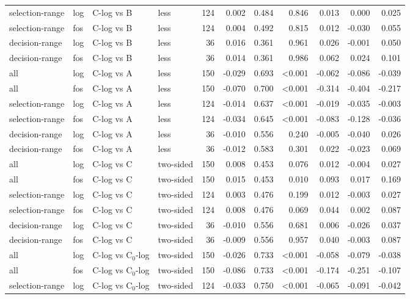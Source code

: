 \begin{longtable}{llllrrrrrrr}
selection-range & log & C-log vs B & less & 124 & 0.002 & 0.484 & 0.846 & 0.013 & 0.000 & 0.025 \\
selection-range & fos & C-log vs B & less & 124 & 0.004 & 0.492 & 0.815 & 0.012 & -0.030 & 0.055 \\
decision-range & log & C-log vs B & less & 36 & 0.016 & 0.361 & 0.961 & 0.026 & -0.001 & 0.050 \\
decision-range & fos & C-log vs B & less & 36 & 0.014 & 0.361 & 0.986 & 0.062 & 0.024 & 0.101 \\
all & log & C-log vs A & less & 150 & -0.029 & 0.693 & <0.001 & -0.062 & -0.086 & -0.039 \\
all & fos & C-log vs A & less & 150 & -0.070 & 0.700 & <0.001 & -0.314 & -0.404 & -0.217 \\
selection-range & log & C-log vs A & less & 124 & -0.014 & 0.637 & <0.001 & -0.019 & -0.035 & -0.003 \\
selection-range & fos & C-log vs A & less & 124 & -0.034 & 0.645 & <0.001 & -0.083 & -0.128 & -0.036 \\
decision-range & log & C-log vs A & less & 36 & -0.010 & 0.556 & 0.240 & -0.005 & -0.040 & 0.026 \\
decision-range & fos & C-log vs A & less & 36 & -0.012 & 0.583 & 0.301 & 0.022 & -0.023 & 0.069 \\
all & log & C-log vs C & two-sided & 150 & 0.008 & 0.453 & 0.076 & 0.012 & -0.004 & 0.027 \\
all & fos & C-log vs C & two-sided & 150 & 0.015 & 0.453 & 0.010 & 0.093 & 0.017 & 0.169 \\
selection-range & log & C-log vs C & two-sided & 124 & 0.003 & 0.476 & 0.199 & 0.012 & -0.003 & 0.027 \\
selection-range & fos & C-log vs C & two-sided & 124 & 0.008 & 0.476 & 0.069 & 0.044 & 0.002 & 0.087 \\
decision-range & log & C-log vs C & two-sided & 36 & -0.010 & 0.556 & 0.681 & 0.006 & -0.026 & 0.037 \\
decision-range & fos & C-log vs C & two-sided & 36 & -0.009 & 0.556 & 0.957 & 0.040 & -0.003 & 0.087 \\
all & log & C-log vs C$_0$-log & two-sided & 150 & -0.026 & 0.733 & <0.001 & -0.058 & -0.079 & -0.038 \\
all & fos & C-log vs C$_0$-log & two-sided & 150 & -0.086 & 0.733 & <0.001 & -0.174 & -0.251 & -0.107 \\
selection-range & log & C-log vs C$_0$-log & two-sided & 124 & -0.033 & 0.750 & <0.001 & -0.065 & -0.091 & -0.042 \\

\end{longtable}
